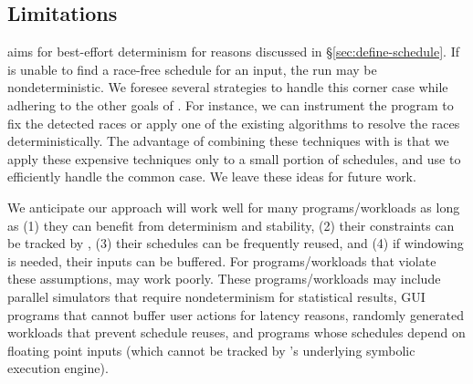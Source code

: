 
\subsection{Limitations} \label{sec:limit}


 \tern aims for best-effort determinism for reasons
discussed in \S\ref{sec:define-schedule}.  If \tern is unable to find a
race-free schedule for an input, the run may be nondeterministic.  We
foresee several strategies to handle this corner case while adhering to
the other goals of \tern.  For instance, we can instrument the program to
fix the detected races or apply one of the existing \dmt algorithms to
resolve the races deterministically.  The advantage of combining these
techniques with \tern is that we apply these expensive techniques only to a
small portion of schedules, and use \tern to efficiently handle the common
case.  We leave these ideas for future work.


 We anticipate our approach will work well for many
programs/workloads as long as (1) they can benefit from determinism and
stability, (2) their constraints can be tracked by \tern, (3) their
schedules can be frequently reused, and (4) if windowing is needed, their
inputs can be buffered.  For programs/workloads that
violate these assumptions, \tern may work poorly.  These programs/workloads
may include parallel simulators that require nondeterminism for
statistical results, GUI programs that cannot buffer user actions for
latency reasons, randomly generated workloads that prevent schedule
reuses, and programs whose schedules depend on floating point inputs
(which cannot be tracked by \tern's underlying symbolic execution engine).

